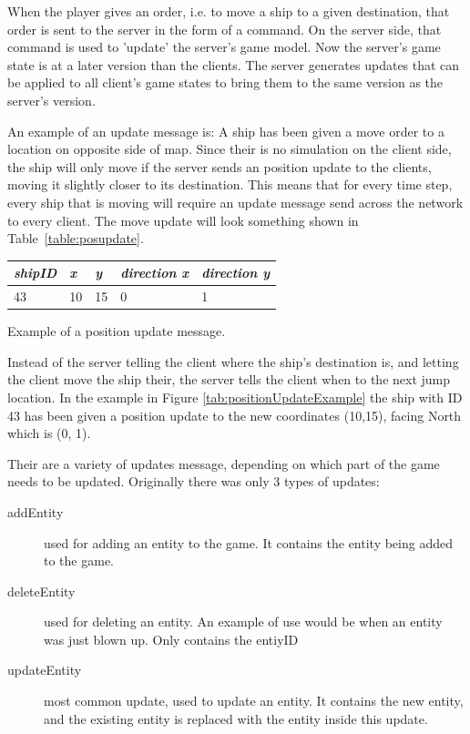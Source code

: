 When the player gives an order, i.e. to move a ship to a given destination, that order is sent to the server in the form of a command.
On the server side, that command is used to 'update' the server's game model. Now the server's game state is at a later version than the clients. The server generates updates that can be applied to all client's game states to bring them to the same version as the server's version.

An example of an update message is: A ship has been given a move order to a location on opposite side of map.
Since their is no simulation on the client side, the ship will only move if the server sends an position update to the clients, moving it slightly closer to its destination. This means that for every time step, every ship that is moving will require an update message send across the network to every client. The move update will look something shown in Table~\ref{table:posupdate}.

\begin{margintable}
    \label{table:posupdate}
    \begin{tabular}{l l l l l}
    \toprule
    \emph{shipID} & \emph{x} & \emph{y} & \emph{direction x} & \emph{direction y} \\ 
    \midrule
    43 & 10 & 15 & 0 & 1 \\
    \bottomrule
    \end{tabular}
    	\vspace{1em}
	\caption[Example of a position update message]{Example of a position update message.}
	\label{tab:positionUpdateExample}
\end{margintable}

Instead of the server telling the client where the ship's destination is, and letting the client move the ship their, the server tells the client when to the next jump location. In the example in Figure \ref{tab:positionUpdateExample} the ship with ID 43 has been given a position update to the new coordinates (10,15), facing North which is (0, 1).

Their are a variety of updates message, depending on which part of the game needs to be updated. 
Originally there was only 3 types of updates:
\begin{description}
\item[addEntity] used for adding an entity to the game. It contains the entity being added to the game.
\item[deleteEntity] used for deleting an entity. An example of use would be when an entity was just blown up. Only contains the entiyID
\item[updateEntity] most common update, used to update an entity. It contains the new entity, and the existing entity is replaced with the entity inside this update.
\end{description}

